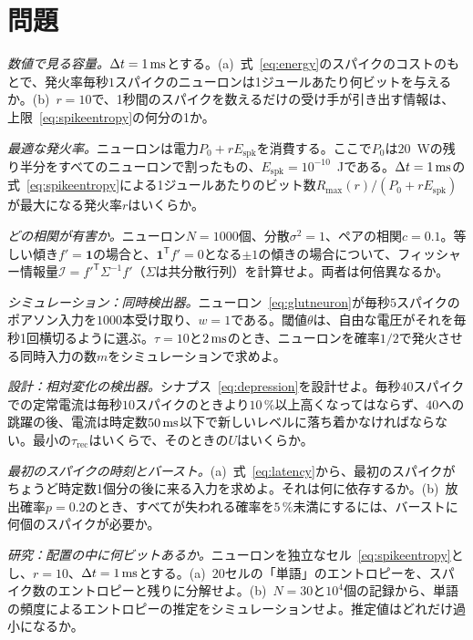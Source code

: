 \section{問題}

\begin{exercise}[\lvlA]
\label{ex:04:1}
\emph{数値で見る容量。}$\Delta t=1\,\text{ms}$とする。(a)~式~\eqref{eq:energy}のスパイクのコストのもとで、発火率毎秒$1$スパイクのニューロンは1ジュールあたり何ビットを与えるか。(b)~$r=10$で、1秒間のスパイクを数えるだけの受け手が引き出す情報は、上限~\eqref{eq:spikeentropy}の何分の1か。
\end{exercise}

\begin{exercise}[\lvlB]
\label{ex:04:2}
\emph{最適な発火率。}ニューロンは電力$P_0+rE_{\text{spk}}$を消費する。ここで$P_0$は$20$~Wの残り半分をすべてのニューロンで割ったもの、$E_{\text{spk}}=10^{-10}$~Jである。$\Delta t=1\,\text{ms}$の式~\eqref{eq:spikeentropy}による1ジュールあたりのビット数$R_{\max}(r)/(P_0+rE_{\text{spk}})$が最大になる発火率$r$はいくらか。
\end{exercise}

\begin{exercise}[\lvlB]
\label{ex:04:3}
\emph{どの相関が有害か。}ニューロン$N=1000$個、分散$\sigma^2=1$、ペアの相関$c=0.1$。等しい傾き$f'=\mathbf 1$の場合と、$\mathbf 1^{\mathsf T}f'=0$となる$\pm1$の傾きの場合について、フィッシャー情報量$\mathcal I=f'^{\mathsf T}\Sigma^{-1}f'$（$\Sigma$は共分散行列）を計算せよ。両者は何倍異なるか。
\end{exercise}

\begin{exercise}[\lvlB]
\label{ex:04:4}
\emph{シミュレーション：同時検出器。}ニューロン~\eqref{eq:glutneuron}が毎秒$5$スパイクのポアソン入力を$1000$本受け取り、$w=1$である。閾値$\theta$は、自由な電圧がそれを毎秒1回横切るように選ぶ。$\tau=10$と$2\,\text{ms}$のとき、ニューロンを確率$1/2$で発火させる同時入力の数$m$をシミュレーションで求めよ。
\end{exercise}

\begin{exercise}[\lvlB]
\label{ex:04:5}
\emph{設計：相対変化の検出器。}シナプス~\eqref{eq:depression}を設計せよ。毎秒$40$スパイクでの定常電流は毎秒$10$スパイクのときより$10\,\%$以上高くなってはならず、$40$への跳躍の後、電流は時定数$50\,\text{ms}$以下で新しいレベルに落ち着かなければならない。最小の$\tau_{\text{rec}}$はいくらで、そのときの$U$はいくらか。
\end{exercise}

\begin{exercise}[\lvlA]
\label{ex:04:6}
\emph{最初のスパイクの時刻とバースト。}(a)~式~\eqref{eq:latency}から、最初のスパイクがちょうど時定数1個分の後に来る入力を求めよ。それは何に依存するか。(b)~放出確率$p=0.2$のとき、すべてが失われる確率を$5\,\%$未満にするには、バーストに何個のスパイクが必要か。
\end{exercise}

\begin{exercise}[\lvlC]
\label{ex:04:7}
\emph{研究：配置の中に何ビットあるか。}ニューロンを独立なセル~\eqref{eq:spikeentropy}とし、$r=10$、$\Delta t=1\,\text{ms}$とする。(a)~$20$セルの「単語」のエントロピーを、スパイク数のエントロピーと残りに分解せよ。(b)~$N=30$と$10^4$個の記録から、単語の頻度によるエントロピーの推定をシミュレーションせよ。推定値はどれだけ過小になるか。
\end{exercise}

